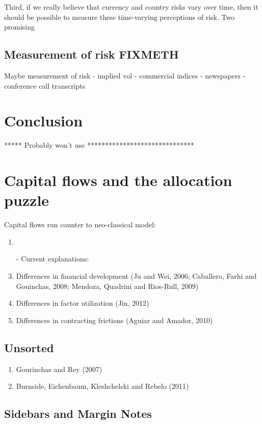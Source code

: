 \documentclass{ar-1col}
\begin{document}
Third, if we really believe that currency and country risks vary over time, then it should be possible to measure these time-varying perceptions of risk. Two promising 



\subsection{Measurement of risk FIXMETH}
Maybe measurement of risk - implied vol - commercial indices - newspapers - conference call transcripts


\section{Conclusion}


***** Probably won't use ******************************


\section*{Capital flows and the allocation puzzle}
Capital flows run counter to neo-classical model:
\begin{enumerate}
\item \citet{GourinchasJeanne2013}
\item[-] Current explanations:
\item Differences in financial development (Ju and Wei, 2006;
  Caballero, Farhi and Gouinchas, 2008; Mendoza, Quadrini and
  Rios-Rull, 2009)
\item Differences in factor utilization (Jin, 2012)
\item Differences in contracting frictions (Aguiar and Amador, 2010)
\end{enumerate}


\subsection{Unsorted}
\begin{enumerate}
\item Gourinchas and Rey (2007)
\item Burnside, Eichenbaum, Kleshchelski and Rebelo (2011)
\end{enumerate}



\subsection{Sidebars and Margin Notes}
\begin{marginnote}[]
    
\end{marginnote}
\end{document}

